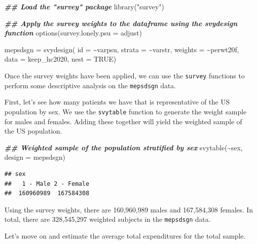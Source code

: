 \documentclass[
]{book}
\newenvironment{Shaded}{\begin{snugshade}}{\end{snugshade}}
\newcommand{\AttributeTok}[1]{\textcolor[rgb]{0.77,0.63,0.00}{#1}}
\newcommand{\ConstantTok}[1]{\textcolor[rgb]{0.00,0.00,0.00}{#1}}
\newcommand{\DocumentationTok}[1]{\textcolor[rgb]{0.56,0.35,0.01}{\textbf{\textit{#1}}}}
\newcommand{\FunctionTok}[1]{\textcolor[rgb]{0.00,0.00,0.00}{#1}}
\newcommand{\NormalTok}[1]{#1}
\newcommand{\OtherTok}[1]{\textcolor[rgb]{0.56,0.35,0.01}{#1}}
\newcommand{\SpecialCharTok}[1]{\textcolor[rgb]{0.00,0.00,0.00}{#1}}
\newcommand{\StringTok}[1]{\textcolor[rgb]{0.31,0.60,0.02}{#1}}
\theoremstyle{definition}
\theoremstyle{definition}
\theoremstyle{definition}
\theoremstyle{definition}
\theoremstyle{remark}
\begin{document}
\begin{Shaded}
\begin{Highlighting}[]
\DocumentationTok{\#\# Load the "survey" package}
\FunctionTok{library}\NormalTok{(}\StringTok{"survey"}\NormalTok{)}

\DocumentationTok{\#\# Apply the survey weights to the dataframe using the svydesign function}
\FunctionTok{options}\NormalTok{(}\AttributeTok{survey.lonely.psu =} \StringTok{\textquotesingle{}adjust\textquotesingle{}}\NormalTok{)}

\NormalTok{mepsdsgn }\OtherTok{=} \FunctionTok{svydesign}\NormalTok{(}
  \AttributeTok{id =} \SpecialCharTok{\textasciitilde{}}\NormalTok{varpsu,}
  \AttributeTok{strata =} \SpecialCharTok{\textasciitilde{}}\NormalTok{varstr,}
  \AttributeTok{weights =} \SpecialCharTok{\textasciitilde{}}\NormalTok{perwt20f,}
  \AttributeTok{data =}\NormalTok{ keep\_hc2020,}
  \AttributeTok{nest =} \ConstantTok{TRUE}\NormalTok{)}
\end{Highlighting}
\end{Shaded}

Once the survey weights have been applied, we can use the \texttt{survey} functions to perform some descriptive analysis on the \texttt{mepsdsgn} data.

First, let's see how many patients we have that is representative of the US population by sex. We use the \texttt{svytable} function to generate the weight sample for males and females. Adding these together will yield the weighted sample of the US population.

\begin{Shaded}
\begin{Highlighting}[]
\DocumentationTok{\#\# Weighted sample of the population stratified by sex}
\FunctionTok{svytable}\NormalTok{(}\SpecialCharTok{\textasciitilde{}}\NormalTok{sex, }\AttributeTok{design =}\NormalTok{ mepsdsgn)}
\end{Highlighting}
\end{Shaded}

\begin{verbatim}
## sex
##   1 - Male 2 - Female 
##  160960989  167584308
\end{verbatim}

Using the survey weights, there are 160,960,989 males and 167,584,308 females. In total, there are 328,545,297 weighted subjects in the \texttt{mepsdsgn} data.

Let's move on and estimate the average total expenditures for the total sample.
\end{document}
